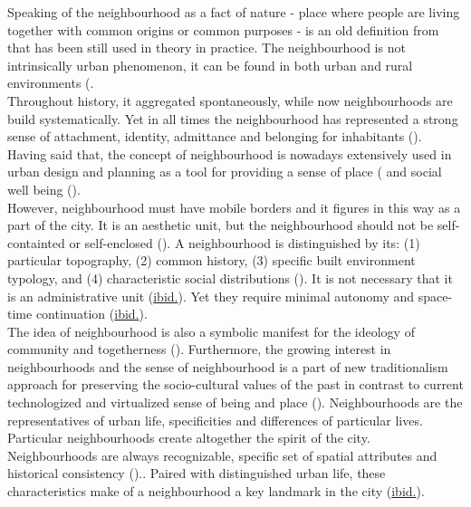 \documentclass[11pt]{report}
\begin{document}
Speaking of the neighbourhood as a fact of nature - place where people are living together with common origins or common purposes - is an old definition from \href{Mumford}{\cite{Mumford (1954)}} that has been still used in theory in practice.
The neighbourhood is not intrinsically urban phenomenon, it can be found in both urban and rural environments
(\href{Merlin}{\citealt{Merlin et Cloay 2009}}.
\\

Throughout history, it aggregated spontaneously, while now neighbourhoods are build systematically.
Yet in all times the neighbourhood has represented a strong sense of attachment, identity, admittance and belonging for inhabitants (\citealt{Meenakshi}).
Having said that, the concept of neighbourhood is nowadays extensively used in urban design and planning as a tool for providing a sense of place (\href{Patricios}{\citealt{Patricios}} and social well being (\href{Meenakshi}{\citealt{Meenakshi}}).
\\

However, neighbourhood must have mobile borders and it figures in this way as a part of the city. It is an aesthetic unit, but the neighbourhood should not be self-containted or self-enclosed (\href{Mumford}{\citealt{Mumford (1954)}}).
A neighbourhood is distinguished by its: (1) particular topography, (2) common history, (3) specific built environment typology, and (4) characteristic social distributions
(\href{Merlin}{\citealt{Merlin et Cloay 2009}}).
It is not necessary that it is an administrative unit (\href{Merlin}{ibid.}).
Yet they require minimal autonomy and space-time continuation (\href{Merlin}{ibid.}).
\\

The idea of neighbourhood is also a symbolic manifest for the ideology of community and togetherness (\href{Lefebvre}{\citealt{Lefebvre}}).
Furthermore, the growing interest in neighbourhoods and the sense of neighbourhood is a part of new traditionalism approach for preserving the socio-cultural values of the past in contrast to current technologized and virtualized sense of being and place (\citealt{Meenakshi}).
Neighbourhoods are the representatives of urban life, specificities and differences of particular lives.
Particular neighbourhoods create altogether the spirit of the city.
Neighbourhoods are always recognizable, specific set of spatial attributes and historical consistency (\href{Merlin}{\citealt{Merlin et Cloay 2009}})..
Paired with distinguished urban life, these characteristics make of a neighbourhood a key landmark in the city (\href{Merlin}{ibid.}).
\end{document}

